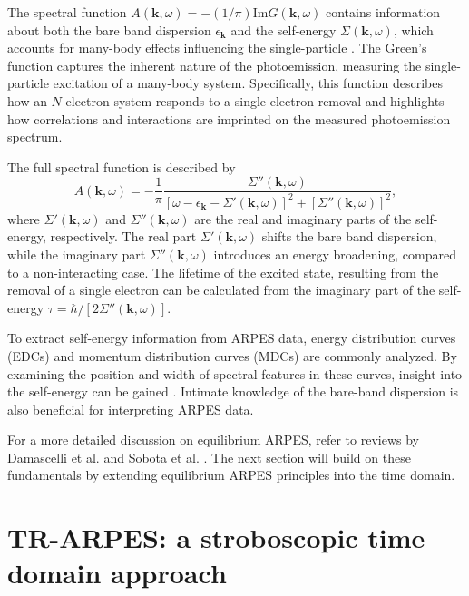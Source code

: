 The spectral function $A(\mathbf{k}, \omega) = -(1/\pi)\text{Im}G(\mathbf{k}, \omega)$ contains information about both the bare band dispersion $\epsilon_\mathbf{k}$ and the self-energy $\Sigma(\mathbf{k}, \omega)$, which accounts for many-body effects influencing the single-particle \cite{mahan_many-particle_2000}.
The Green's function captures the inherent nature of the photoemission, measuring the single-particle excitation of a many-body system.
Specifically, this function describes how an $N$ electron system responds to a single electron removal and highlights how correlations and interactions are imprinted on the measured photoemission spectrum.

The full spectral function is described by
\begin{equation} A(\mathbf{k}, \omega) = -\frac{1}{\pi} \frac{\Sigma''(\mathbf{k}, \omega)}{\left[ \omega - \epsilon_\mathbf{k} - \Sigma'(\mathbf{k}, \omega) \right]^2 + \left[ \Sigma''(\mathbf{k}, \omega) \right]^2},
\end{equation}
where $\Sigma'(\mathbf{k}, \omega)$ and $\Sigma''(\mathbf{k}, \omega)$ are the real and imaginary parts of the self-energy, respectively.
The real part $\Sigma'(\mathbf{k}, \omega)$ shifts the bare band dispersion, while the imaginary part $\Sigma''(\mathbf{k}, \omega)$ introduces an energy broadening, compared to a non-interacting case.
The lifetime of the excited state, resulting from the removal of a single electron can be calculated from the imaginary part of the self-energy $\tau=\hbar/\left[2\Sigma''(\mathbf{k}, \omega)\right]$.

To extract self-energy information from ARPES data, energy distribution curves (EDCs) and momentum distribution curves (MDCs) are commonly analyzed.
By examining the position and width of spectral features in these curves, insight into the self-energy can be gained \cite{norman_extraction_1999, freericks_what_2021,kurleto_about_2021}.
Intimate knowledge of the bare-band dispersion is also beneficial for interpreting ARPES data.

For a more detailed discussion on equilibrium ARPES, refer to reviews by Damascelli et al. and Sobota et al. \cite{damascelli_angle-resolved_2003,sobota_angle-resolved_2021}.
The next section will build on these fundamentals by extending equilibrium ARPES principles into the time domain.

\section{TR-ARPES: a stroboscopic time domain approach}

